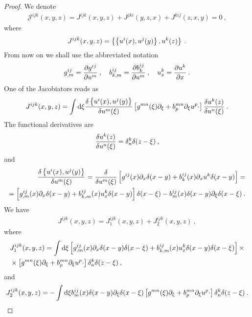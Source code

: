 \begin{proof}
    We denote
    \begin{align}
        \mathcal J^{ijk}(x,y,z) = J^{ijk}(x,y,z)+ J^{jki}(y,z,x)+ J^{kij}(z,x,y) = 0 \:,
    \end{align}
    where
    \begin{align}
        J^{ijk}(x,y,z) = \left \lbrace \left \lbrace u^i(x),u^j(y) \right \rbrace, u^k(z) \right \rbrace \:.
    \end{align}
    From now on we shall use the abbreviated notation
    \begin{align}
        g^{ij}_{,m} = \frac{\partial g^{ij}}{\partial u^m} \:, \quad b^{ij}_{k,m} = \frac{\partial b^{ij}_k}{\partial u^m} \:, \quad u^k_x = \frac{\partial u^k}{\partial x}  \:.
    \end{align}
    One of the Jacobiators reads as
    \begin{align}
        J^{ijk}(x,y,z) =
        \int \mathrm{d} \xi \frac{\delta \left \lbrace u^i(x),u^j(y) \right \rbrace}{\delta u^m(\xi)} 
        \left[ g^{mn}(\xi) \partial_\xi + b^{mn}_p \partial_\xi u^p \cdot \right] \frac{\delta u^k(z)}{\delta u^n(\xi)}  \:.
    \end{align}
    The functional derivatives are
    \begin{align}
        \frac{\delta u^k(z)}{\delta u^n(\xi)} = \delta^k_n \delta(z-\xi) \:,
    \end{align}
    and 
    \begin{align}
        \frac{\delta \left \lbrace u^i(x),u^j(y) \right \rbrace}{\delta u^m(\xi)} = \frac{\delta }{\delta u^m(\xi)} \left[ g^{ij}(x) \partial_x \delta(x-y) + b^{ij}_k(x) \partial_x u^k \delta(x-y)\right] = 
        \nonumber
        \\ = \left[ g^{ij}_{,m}(x) \partial_x \delta(x-y) + b^{ij}_{k,m}(x) u^k_x \delta(x-y) \right] \delta (x-\xi) - b^{ij}_m(x) \delta(x-y) \partial_\xi \delta(x-\xi) \:.
    \end{align}
    We have
    \begin{align}
        J^{ijk}(x,y,z) = J_1^{ijk}(x,y,z) + J_2^{ijk}(x,y,z) \:,
    \end{align}
    where
    \begin{align}
        & J_1^{ijk}(x,y,z) = \int \mathrm{d} \xi  \left[ g^{ij}_{,m}(x) \partial_x \delta(x-y) \delta(x-\xi) + b^{ij}_{k,m}(x) u^k_x \delta(x-y) \delta(x-\xi) \right] \times \nonumber \\ 
        & \times \left[ g^{mn}(\xi) \partial_\xi + b^{mn}_p \partial_\xi u^p \cdot \right] \delta^k_n \delta(z-\xi)  \:, 
    \end{align}
    and 
    \begin{align}
        J_2^{ijk}(x,y,z) = - \int \D \xi b^{ij}_m(x) \delta(x-y) \partial_\xi \delta(x-\xi) \left[ g^{mn}(\xi) \partial_\xi + b^{mn}_p \partial_\xi u^p \cdot \right] \delta^k_n \delta(z-\xi)  \:.

\end{align}
\end{proof}
